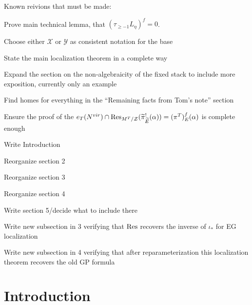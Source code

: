 \documentclass[12pt,dvipsnames]{amsart}
\begin{document}
Known reivions that must be made:
\begin{todolist}
  \item Prove main technical lemma, that \((\tau_{\geq -1}L_\eta)^f = 0\).
  \item Choose either \(\mathcal X\) or \(\mathcal Y\) as consistent notation for the base
  \item State the main localization theorem in a complete way
  \item Expand the section on the non-algebraicity of the fixed stack to include more exposition, currently only an example
  \item Find homes for everything in the ``Remaining facts from Tom's note'' section
  \item Ensure the proof of the \(e_T(N^{vir})\cap \operatorname{Res}_{M^T/\mathcal Z}(\widetilde \pi^!_{\widetilde E}(\alpha)) = (\pi^T)^f_{E}(\alpha)\) is complete enough
  \item Write Introduction
  \item Reorganize section 2
  \item Reorganize section 3
  \item Reorganize section 4
  \item Write section 5/decide what to include there
  \item Write new subsection in 3 verifying that $\operatorname{Res}$ recovers the inverse of \(\iota_*\) for EG localization
  \item Write new subsection in 4 verifying that after reparameterization this localization theorem recovers the old GP formula
\end{todolist}

\newpage

\section{Introduction}\label{rl-0001}
\end{document}
